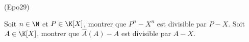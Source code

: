 \begin{tiny}(Epo29)\end{tiny} Soit $n\in\N$ et $P\in \K[X]$, montrer que $P^n - X^n$ est divisible par $P-X$. Soit $A\in \K[X]$, montrer que $\widehat{A}(A)-A$ est divisible par $A-X$. 